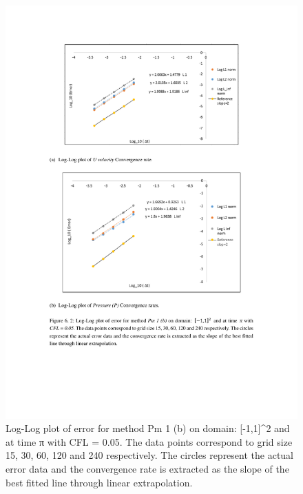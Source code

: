 \begin{figure}[H]
	\centering
	\includegraphics[scale=0.9]{figures/Pm1b_pf2_rate_t_pi_grid_60_cfl_0_05.pdf}
	\caption{Log-Log plot of error for method Pm 1 (b) on domain: [-1,1]^2 and at time π with CFL = 0.05. The data points correspond to grid size 15, 30, 60, 120 and 240 respectively. The circles represent the actual error data and the convergence rate is extracted as the slope of the best fitted line through linear extrapolation.}\label{fig:6.2}
\end{figure}

